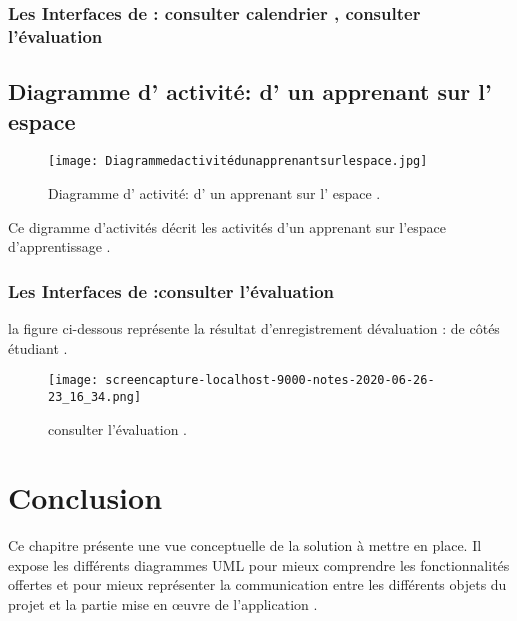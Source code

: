 \clearpage
\subsubsection{Les Interfaces de : consulter calendrier , consulter l'évaluation   }

\subsection{Diagramme d' activité: d' un apprenant sur l' espace}


\begin{figure}[ht]
	\centering
	\texttt{[image: Diagrammedactivitédunapprenantsurlespace.jpg]}
	\caption{Diagramme d' activité: d' un apprenant sur l' espace .}
	\label{fig:Diagramme d' activité: d' un apprenant sur l' espace }
\end{figure}
\FloatBarrier

Ce digramme d’activités décrit les activités d’un apprenant  sur l'espace d'apprentissage .
\subsubsection{Les Interfaces de :consulter l'évaluation  }

la figure ci-dessous représente la résultat  d'enregistrement dévaluation : de côtés  étudiant .
\begin{figure}[ht]
	\centering
	\texttt{[image: screencapture-localhost-9000-notes-2020-06-26-23\_16\_34.png]}
	\caption{consulter l'évaluation .}
	\label{fig:consulter l'évaluation }
\end{figure}
\FloatBarrier



\section{Conclusion}

Ce chapitre présente une vue conceptuelle de la solution à mettre en place. Il expose les différents diagrammes UML pour mieux comprendre les fonctionnalités offertes et pour mieux représenter la communication entre les différents objets du projet et la partie mise en œuvre de l’application .


